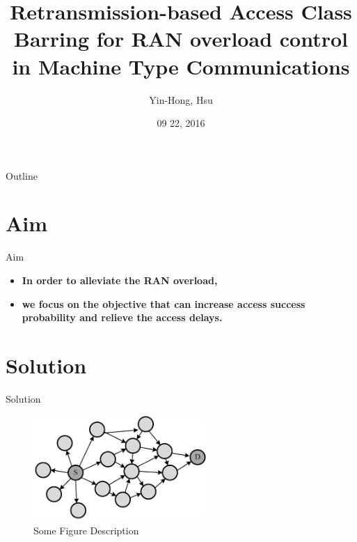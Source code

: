 \documentclass{beamer}
\title {
    Retransmission-based Access Class Barring for RAN overload control in Machine Type Communications
}
\author {
    Yin-Hong, Hsu
}
\date {
    09 22, 2016
}
\begin{document}
\begin{frame}
    \titlepage
\end{frame}


\begin{frame}{Outline}
    \tableofcontentsgather
    \tableofcontents
\end{frame}

\section{Aim}

\begin{frame}{Aim} 
    \begin{itemize}
        \item \textbf{In order to alleviate the RAN overload,}
    \end{itemize}

    \begin{itemize}
        \item \textbf{we focus on the objective that can increase access success probability and relieve the access delays.}
    \end{itemize}
\end{frame}

\section{Solution}

\begin{frame}{Solution}
    \begin{figure}[t]
        \centering
        \includegraphics[width=0.6\textwidth]{figures/Fig_1-1.png}
        \caption{Some Figure Description}
    \end{figure}
\end{frame}
\end{document}
